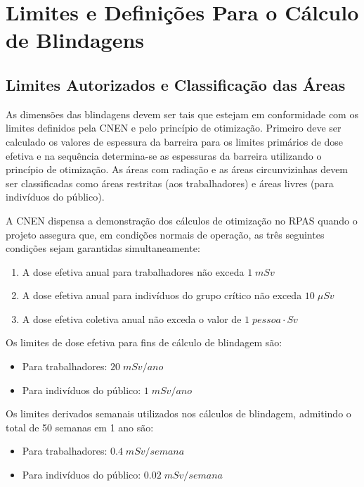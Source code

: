 \documentclass[11pt,a4paper]{article}
\begin{document}
    \section{Limites e Definições Para o Cálculo de Blindagens}

        \subsection{Limites Autorizados e Classificação das Áreas}

            As dimensões das blindagens devem ser tais que estejam em conformidade com os limites definidos pela CNEN e pelo princípio de otimização. Primeiro deve ser calculado os valores de espessura da barreira para os limites primários de dose efetiva e na sequência determina-se as espessuras da barreira utilizando o princípio de otimização. As áreas com radiação e as áreas circunvizinhas devem ser classificadas como áreas restritas (aos trabalhadores) e áreas livres (para indivíduos do público).
            

            A CNEN dispensa a demonstração dos cálculos de otimização no RPAS quando o projeto assegura que, em condições normais de operação, as três seguintes condições sejam garantidas simultaneamente:

            \begin{enumerate}
                \item A dose efetiva anual para trabalhadores não  exceda $1 \; mSv$
                \item A dose efetiva anual para indivíduos do grupo crítico não exceda $10 \; \mu Sv$
                \item A dose efetiva coletiva anual não exceda o valor de $1 \; pessoa \cdot Sv$
            \end{enumerate}

            Os limites de dose efetiva para fins de cálculo de blindagem são:

            \begin{itemize}
                \item Para trabalhadores: $20 \; mSv / ano$
                \item Para indivíduos do público: $1 \; mSv/ano$
            \end{itemize}

            Os limites derivados semanais utilizados nos cálculos de blindagem, admitindo o total de 50 semanas em 1 ano são:

            \begin{itemize}
                \item Para trabalhadores: $0.4 \; mSv / semana$
                \item Para indivíduos do público: $0.02 \; mSv/semana$
            \end{itemize}
\end{document}
